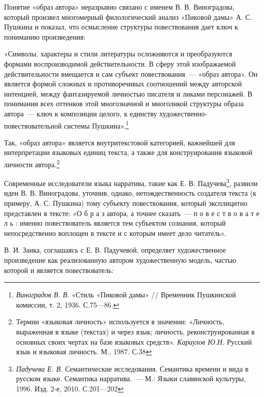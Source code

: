 \documentclass{kursa4}
\begin{document}
{      Понятие «образ автора» неразрывно связано с именем В. В.
      Виноградова, который произвел многомерный филологический анализ
      «Пиковой дамы» А. С. Пушкина и показал, что осмысление структуры
      повествования дает ключ к пониманию произведения:

      «Символы, характеры и стили литературы осложняются и преобразуются
      формами воспроизводимой действительности. В сферу этой изображаемой
      действительности вмещается и сам субъект повествования~--- «образ
      автора». Он является формой сложных и противоречивых соотношений между
      авторской интенцией, между фантазируемой личностью писателя и ликами
      персонажей. В понимании всех оттенков этой многозначной и многоликой
      структуры образа автора~--- ключ к композиции целого, к единству
      художественно-повествовательной системы
      Пушкина».\footnote{\textit{{Виноградов В. В.
      }}{«Стиль «Пиковой дамы» // Временник Пушкинской
      комиссии, т. 2, 1936. С.75—86.}} 

      Так, «образ автора» является внутритекстовой категорией, важнейшей
      для интерпретации языковых единиц текста, а также для конструирования
      языковой личности автора.\footnote{{Термин «языковая
      личность» используется в значении: «Личность, выраженная в языке
      (текстах) и через язык; личность, реконструированная в основных своих
      чертах на базе языковых средств». }\textit{{Караулов
      Ю.Н. }}{Русский язык и языковая личность. М., 1987.
      С.38}} 

      Современные исследователи языка нарратива, такие как Е. В.
      Падучева\footnote{\textit{{Падучева Е. В.
      }}{Семантические исследования. Семантика времени и
      вида в русском языке. Семантика нарратива.~--- М.: Языки славянской
      культуры, 1996. Изд. 2-е, 2010. С.201—202}}, развили идеи В. В. Виноградова, уточнив, однако,
      нетождественность создателя текста (к примеру, А. С. Пушкина) тому
      субъекту повествования, который эксплицитно представлен в
      тексте:\newline
      «О б р а з автора, а точнее сказать~--- п о в е с т в о в а т е л ь :
      именно повествователь является тем субъектом сознания, который
      непосредственно воплощен в тексте и с которым имеет дело читатель». 

      В. И. Заика, соглашаясь с Е. В. Падучевой, определяет художественное
      произведение как реализованную автором художественную модель, частью
      которой и является повествователь:

}
\end{document}
